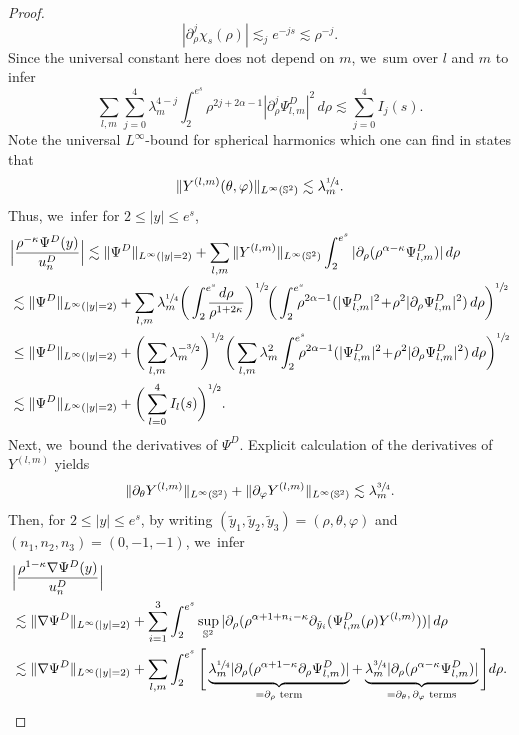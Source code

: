\documentclass[10pt]{amsart}
\theoremstyle{plain}
\theoremstyle{definition}
\begin{document}
\begin{proof}
\[
|\partial_\rho^j\chi_s(\rho)|\lesssim_j e^{-js}\lesssim \rho^{-j}.
\]
Since the universal constant here does not depend on $m$, we~sum over $l$ and $m$ to infer
\[
\sum_{l,m}\sum_{j=0}^{4}\lambda_m^{4-j}\int_2^{e^s} \rho^{2j+2\alpha-1}|\partial_\rho^j \Psi_{l,m}^D|^2\,d\rho \lesssim \sum_{j=0}^4 I_j(s).
\]
Note the universal $L^\infty$-bound for spherical harmonics which one can find in \cite{TZ} states that
\[
\Vert Y^{(l,m)}(\theta,\varphi)\Vert_{L^\infty(\mathbb S^2)}\lesssim \lambda_m^{\sfrac{1}{4}}.
\]
Thus, we~infer for $2\le |y|\le e^s$,
\[
\begin{aligned}
&\Big|\frac{\rho^{-\kappa}\Psi^D(y)}{u_n^D}\Big|\lesssim \Vert \Psi^D\Vert_{L^\infty(|y|=2)}+\sum_{l,m}\Vert Y^{(l,m)}\Vert_{L^\infty(\mathbb S^2)}\int_2^{e^s}|\partial_\rho(\rho^{\alpha-\kappa}\Psi_{l,m}^D)|\,d\rho\\
&\lesssim \Vert \Psi^D\Vert_{L^\infty(|y|=2)}+\sum_{l,m}\lambda_m^{\sfrac{1}{4}}\bigg(\int_2^{e^s}\hspace*{-3mm}\frac{d\rho}{ \rho^{1+2\kappa}}\bigg)^{\sfrac{1}{2}}\!\bigg(\int_2^{e^s}\hspace*{-2.5mm}\rho^{2\alpha-1}(|\Psi_{l,m}^D|^2\!+\!\rho^2|\partial_\rho\Psi_{l,m}^D|^2)\,d\rho\bigg)^{\sfrac{1}{2}}\\
&\le \Vert \Psi^D\Vert_{L^\infty(|y|=2)}+\bigg(\sum_{l,m} \lambda_m^{-\sfrac{3}{2}}\bigg)^{\sfrac{1}{2}}\bigg(\sum_{l,m}\lambda_m^2\int_2^{e^s}\hspace*{-2.5mm}\rho^{2\alpha-1}(|\Psi_{l,m}^D|^2\!+\!\rho^2|\partial_\rho\Psi_{l,m}^D|^2)\,d\rho\bigg)^{\sfrac{1}{2}}\\
&\lesssim \Vert \Psi^D\Vert_{L^\infty(|y|=2)}+ \bigg(\sum_{l=0}^4I_l(s)\bigg)^{\sfrac{1}{2}}.
\end{aligned}
\]
Next, we~bound the derivatives of $\Psi^D$. Explicit calculation of the derivatives of $Y^{(l,m)}$ yields
\[
\Vert \partial_\theta Y^{(l,m)}\Vert_{L^\infty(\mathbb S^2)}+\Vert \partial_\varphi Y^{(l,m)}\Vert_{L^\infty(\mathbb S^2)}\lesssim \lambda_m^{\sfrac{3}{4}}.
\]
Then, for $2\le |y|\le e^s$, by writing $(\tilde y_1,\tilde y_2,\tilde y_3)=(\rho,\theta,\varphi)$ and $(n_1,n_2,n_3)=(0,-1,-1)$, we~infer
\[
\begin{aligned}
& \Big |\frac{\rho^{1-\kappa}\nabla\Psi^D(y)}{u_n^D} \Big |\\
&\lesssim \Vert \nabla\Psi^D\Vert_{L^\infty(|y|=2)}+\sum_{i=1}^3\int_2^{e^s}\sup_{\mathbb S^2}|\partial_\rho(\rho^{\alpha+1+n_i-\kappa}\partial_{\tilde y_i}(\Psi_{l,m}^D(\rho)Y^{(l,m)}))|\,d\rho\\
&\lesssim \Vert \nabla\Psi^D\Vert_{L^\infty(|y|=2)}+\sum_{l,m}\int_2^{e^s}\Bigg[\underbrace{\lambda_m^{\sfrac{1}{4}}|\partial_\rho(\rho^{\alpha+1-\kappa}\partial_\rho\Psi_{l,m}^D)|}_{=\partial_\rho \text{ term}}+\underbrace{\lambda_m^{\sfrac{3}{4}}|\partial_\rho(\rho^{\alpha-\kappa}\Psi_{l,m}^D)|}_{=\partial_\theta,\,\partial_\varphi\text{ terms}}\Bigg]d\rho.

\end{aligned}\]
\end{proof}
\end{document}
